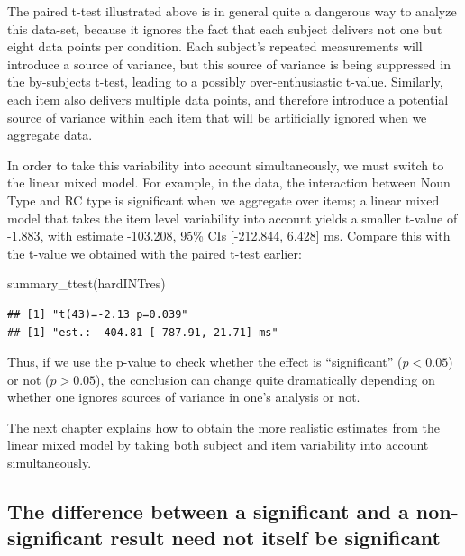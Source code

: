 \documentclass[
  12pt,
]{krantz}
\newenvironment{Shaded}{\begin{snugshade}}{\end{snugshade}}
\newcommand{\FunctionTok}[1]{\textcolor[rgb]{0.00,0.00,0.00}{#1}}
\newcommand{\NormalTok}[1]{#1}
\theoremstyle{definition}
\theoremstyle{definition}
\theoremstyle{definition}
\theoremstyle{definition}
\theoremstyle{remark}
\begin{document}
The paired t-test illustrated above is in general quite a dangerous way to analyze this data-set, because it ignores the fact that each subject delivers not one but eight data points per condition. Each subject's repeated measurements will introduce a source of variance, but this source of variance is being suppressed in the by-subjects t-test, leading to a possibly over-enthusiastic t-value. Similarly, each item also delivers multiple data points, and therefore introduce a potential source of variance within each item that will be artificially ignored when we aggregate data.

In order to take this variability into account simultaneously, we must switch to the linear mixed model. For example, in the \citet{fedorenko2006nature} data, the interaction between Noun Type and RC type is significant when we aggregate over items; a linear mixed model that takes the item level variability into account yields a smaller t-value of -1.883, with estimate -103.208, 95\% CIs {[}-212.844, 6.428{]} ms. Compare this with the t-value we obtained with the paired t-test earlier:

\begin{Shaded}
\begin{Highlighting}[]
\FunctionTok{summary\_ttest}\NormalTok{(hardINTres)}
\end{Highlighting}
\end{Shaded}

\begin{verbatim}
## [1] "t(43)=-2.13 p=0.039"
## [1] "est.: -404.81 [-787.91,-21.71] ms"
\end{verbatim}

Thus, if we use the p-value to check whether the effect is ``significant'' (\(p<0.05\)) or not (\(p>0.05\)), the conclusion can change quite dramatically depending on whether one ignores sources of variance in one's analysis or not.

The next chapter explains how to obtain the more realistic estimates from the linear mixed model by taking both subject and item variability into account simultaneously.

\hypertarget{the-difference-between-a-significant-and-a-non-significant-result-need-not-itself-be-significant}{%
\subsection{The difference between a significant and a non-significant result need not itself be significant}\label{the-difference-between-a-significant-and-a-non-significant-result-need-not-itself-be-significant}}
\end{document}
